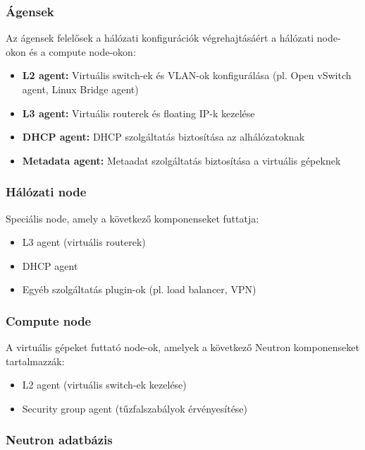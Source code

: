 \documentclass[a4paper,12pt]{article}
\begin{document}
    \subsubsection{Ágensek}

    Az ágensek felelősek a hálózati konfigurációk végrehajtásáért a hálózati node-okon és a compute node-okon:

    \begin{itemize}
        \item \textbf{L2 agent:} Virtuális switch-ek és VLAN-ok konfigurálása (pl. Open vSwitch agent, Linux Bridge agent)
        \item \textbf{L3 agent:} Virtuális routerek és floating IP-k kezelése
        \item \textbf{DHCP agent:} DHCP szolgáltatás biztosítása az alhálózatoknak
        \item \textbf{Metadata agent:} Metaadat szolgáltatás biztosítása a virtuális gépeknek
    \end{itemize}

    \subsubsection{Hálózati node}

    Speciális node, amely a következő komponenseket futtatja:

    \begin{itemize}
        \item L3 agent (virtuális routerek)
        \item DHCP agent
        \item Egyéb szolgáltatás plugin-ok (pl. load balancer, VPN)
    \end{itemize}

    \subsubsection{Compute node}

    A virtuális gépeket futtató node-ok, amelyek a következő Neutron komponenseket tartalmazzák:

    \begin{itemize}
        \item L2 agent (virtuális switch-ek kezelése)
        \item Security group agent (tűzfalszabályok érvényesítése)
    \end{itemize}

    \subsubsection{Neutron adatbázis}
\end{document}
